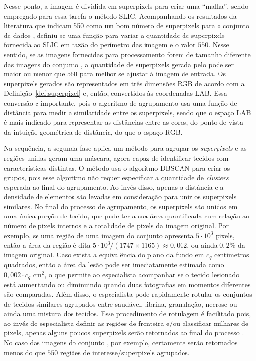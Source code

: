 Nesse ponto, a imagem é dividida em superpixels para criar uma ``malha'', sendo empregado para essa tarefa o método SLIC.
Acompanhando os resultados da literatura que indicam 550 como um bom número de superpixels para o conjunto de dados \dataset, definiu-se uma função para variar a quantidade de superpixels fornecida ao SLIC em razão do perímetro das imagem e o valor $550$.
Nesse sentido, se as imagens fornecidas para processamento forem de tamanho diferente das imagens do conjunto \dataset, a quantidade de superpixels gerada pelo \system pode ser maior ou menor que $550$ para melhor se ajustar à imagem de entrada.
Os superpixels gerados são representados em três dimensões RGB de acordo com a Definição~\ref{def:superpixel} e, então, convertidos às coordenadas LAB.
Essa conversão é importante, pois o algoritmo de agrupamento usa uma função de distância para medir a similaridade entre os superpixels, sendo que o espaço LAB é mais indicado para representar as distâncias entre as cores, do ponto de vista da intuição geométrica de distância, do que o espaço RGB.

Na sequência, a segunda fase aplica um método para agrupar os \textit{superpixels} e as regiões unidas geram uma máscara, agora capaz de identificar tecidos com características distintas.
O método \system usa o algoritmo DBSCAN para criar os grupos, pois esse algoritmo não requer especificar a quantidade de \textit{clusters} esperada ao final do agrupamento.
Ao invés disso, apenas a distância e a densidade de elementos são levadas em consideração para unir os superpixels similares.
No final do processo de agrupamento, os superpixels são unidos em uma única porção de tecido, que pode ter a sua área quantificada com relação ao número de pixels internos e a totalidade de pixels da imagem original.
Por exemplo, se uma região de uma imagem do conjunto \dataset apresenta $5 \cdot 10^3$ pixels, então a área da região é dita $5 \cdot 10^3/ (1747 \times 1165) \approx 0,002$, ou ainda $0,2\%$ da imagem original.
Caso exista a equivalência do plano da fundo em $c_q$ centímetros quadrados, então a área da lesão pode ser imediatamente estimada como $0,002 \cdot c_q$ cm$^2$, o que permite ao especialista acompanhar se o tecido lesionado está aumentando ou diminuindo quando duas fotografias em momentos diferentes são comparadas.
Além disso, o especialista pode rapidamente rotular os conjuntos de tecidos similares agrupados entre saudável, fibrina, granulação, necrose ou ainda uma mistura dos tecidos.
Esse procedimento de rotulagem é facilitado pois, ao invés do especialista definir as regiões de fronteira e/ou classificar milhares de pixels, apenas alguns poucos superpixels serão retornados ao final do processo \system.
No caso das imagens do conjunto \dataset, por exemplo, certamente serão retornados menos do que $550$ regiões de interesse/superpixels agrupados.


